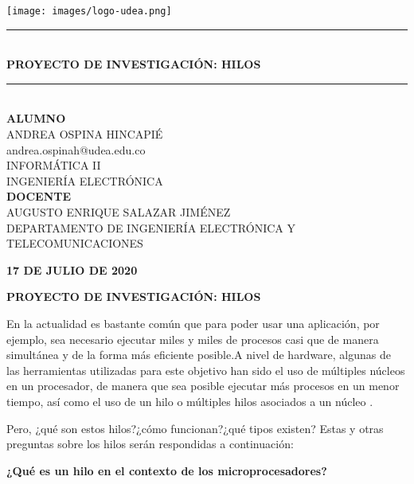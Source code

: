 \documentclass[a4paper,11pt]{article}
\newcommand{\HRule}{\rule{\linewidth}{0.5mm}}
\begin{document}
\begin{titlepage}
\begin{center}

\texttt{[image: images/logo-udea.png]}~
\\[2cm]



\HRule \\[0.4cm]
{\large \bfseries PROYECTO DE INVESTIGACIÓN: HILOS \\
[0.4cm]}
\HRule 
\\[2cm]

\large\textbf{ALUMNO}\\[1cm]
ANDREA OSPINA HINCAPIÉ\\
andrea.ospinah@udea.edu.co\\
INFORMÁTICA II \\
 INGENIERÍA ELECTRÓNICA
\\[1.5cm]

\large\textbf{DOCENTE}\\[1cm]
AUGUSTO ENRIQUE SALAZAR JIMÉNEZ\\
DEPARTAMENTO DE INGENIERÍA ELECTRÓNICA Y TELECOMUNICACIONES
\\[1cm]



\vfill

{\large \textbf{17 DE JULIO DE 2020}}

\end{center}
\end{titlepage}

\newpage
\centerline{{\large\bfseries PROYECTO DE INVESTIGACIÓN: HILOS}}

En la actualidad es bastante común que para poder usar una aplicación, por ejemplo, sea necesario ejecutar miles y miles de procesos casi que de manera simultánea y de la forma más eficiente posible.A nivel de hardware, algunas de las herramientas utilizadas para este objetivo han sido el uso de múltiples núcleos en un procesador, de manera que sea posible ejecutar más procesos en un menor tiempo, así como el uso de un hilo o múltiples hilos asociados a un núcleo \cite[p.736]{Chivers2003}.

Pero, ¿qué son estos hilos?¿cómo funcionan?¿qué tipos existen? Estas y otras preguntas sobre los hilos serán respondidas a continuación:

{\large\bfseries ¿Qué es un hilo en el contexto de los microprocesadores?} 
\end{document}

